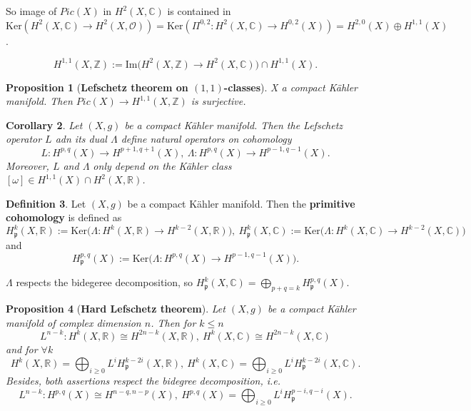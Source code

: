 \documentclass{article}
\theoremstyle{definition}
\newtheorem{definition}{Definition}[subsection]
\theoremstyle{plain}
\newtheorem{corollary}[definition]{Corollary}
\newtheorem{proposition}[definition]{Proposition}
\begin{document}
So image of $ Pic(X) $ in $ H^2(X,\mathbb{C}) $ is contained in $ \mathrm{Ker}(H^2(X,\mathbb{C})\rightarrow H^2(X,\mathcal{O}))=\mathrm{Ker}(\varPi^{0,2}:H^2(X,\mathbb{C})\rightarrow H^{0,2}(X))=H^{2,0}(X)\oplus H^{1,1}(X) $.

\[
    H^{1,1}(X,\mathbb{Z}):=\mathrm{Im}\big(H^2(X,\mathbb{Z})\longrightarrow H^2(X,\mathbb{C})\big)\cap H^{1,1}(X).
\]

\begin{proposition}[\textbf{Lefschetz theorem on $ (1,1) $-classes}]
    X a compact K\"{a}hler manifold. Then $ Pic(X)\rightarrow H^{1,1}(X,\mathbb{Z}) $ is surjective.
\end{proposition}

\begin{corollary}
    Let $ (X,g) $ be a compact K\"{a}hler manifold. Then the Lefschetz operator $ L $ adn its dual $ \varLambda $ define natural operators on cohomology\[
        L: H^{p,q}(X)\longrightarrow H^{p+1,q+1}(X),\ \varLambda:H^{p,q}(X)\longrightarrow H^{p-1,q-1}(X).
    \]Moreover, $ L $ and $ \varLambda $ only depend on the K\"{a}hler class $ [\omega]\in H^{1,1}(X)\cap H^2(X,\mathbb{R}) $.
\end{corollary}

\begin{definition}
    Let $ (X,g) $ be a compact K\"{a}hler manifold. Then the \textbf{primitive cohomology} is defined as \[
        H^k_{\mathfrak{p}}(X,\mathbb{R}):=\mathrm{Ker}\big(\varLambda: H^k(X,\mathbb{R})\longrightarrow H^{k-2}(X,\mathbb{R})\big),\ H^k_{\mathfrak{p}}(X,\mathbb{C}):=\mathrm{Ker}\big(\varLambda: H^k(X,\mathbb{C})\longrightarrow H^{k-2}(X,\mathbb{C})\big)
    \]and\[
        H^{p,q}_{\mathfrak{p}}(X):=\mathrm{Ker}\big(\Lambda:H^{p,q}(X)\longrightarrow H^{p-1,q-1}(X)\big).
    \]
\end{definition}

$ \varLambda $ respects the bidegeree decomposition, so $ H^k_{\mathfrak{p}}(X,\mathbb{C})=\bigoplus_{p+q=k}H^{p,q}_{\mathfrak{p}}(X) $.

\begin{proposition}[\textbf{Hard Lefschetz theorem}]
    Let $ (X,g) $ be a compact K\"{a}hler manifold of complex dimension $ n $. Then for $ k\leqslant n $\[
        L^{n-k}: H^k(X,\mathbb{R})\cong H^{2n-k}(X,\mathbb{R}),\ H^k(X,\mathbb{C})\cong H^{2n-k}(X,\mathbb{C})
    \]and for $ \forall k $\[
        H^k(X,\mathbb{R})=\bigoplus_{i\geqslant 0}L^i H^{k-2i}_{\mathfrak{p}}(X,\mathbb{R}),\ H^k(X,\mathbb{C})=\bigoplus_{i\geqslant 0}L^i H^{k-2i}_{\mathfrak{p}}(X,\mathbb{C}).
    \]Besides, both assertions respect the bidegree decomposition, i.e.\[
        L^{n-k}:H^{p,q}(X)\cong H^{n-q,n-p}(X),\ H^{p,q}(X)=\bigoplus_{i\geqslant 0}L^i H^{p-i,q-i}_{\mathfrak{p}}(X).
    \]
\end{proposition}
\end{document}

